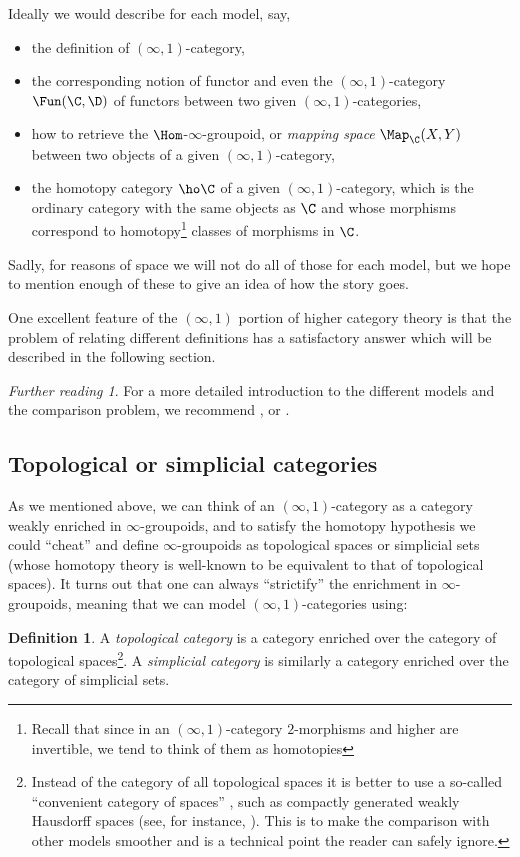 \documentclass{conm-p-l}
\theoremstyle{definition} \newtheorem{definition}[theorem]{Definition}
\theoremstyle{remark} \newtheorem{remark}[theorem]{Remark}
\newtheorem*{further}{Further reading}
\numberwithin{equation}{section}
\newcommand{\oo}{\infty}
\newcommand{\io}{$(\oo,1)$}
\begin{document}
Ideally we would describe for each model, say, \begin{itemize} \item
the definition of \io-category, \item the corresponding notion of
functor and even the \io-category $\Fun(\C,\D)$ of functors between
two given \io-categories, \item how to retrieve the
$\Hom$-$\oo$-groupoid, or \emph{mapping space} $\Map_\C(X,Y)$ between
two objects of a given \io-category, \item the homotopy category $\ho
\C$ of a given \io-category, which is the ordinary category with the
same objects as $\C$ and whose morphisms correspond to
homotopy\footnote{Recall that since in an \io-category $2$-morphisms
and higher are invertible, we tend to think of them as homotopies}
classes of morphisms in $\C$. \end{itemize}

Sadly, for reasons of space we will not do all of those for each
model, but we hope to mention enough of these to give an idea of how
the story goes.

One excellent feature of the \io{} portion of higher category theory
is that the problem of relating different definitions has a
satisfactory answer which will be described in the following section.

\begin{further} For a more detailed introduction to the different
models and the comparison problem, we recommend \cite{BergnerSurvey},
\cite{JoyalTierney} or \cite{Porter}. \end{further}

\subsection{Topological or simplicial categories}

As we mentioned above, we can think of an \io-category as a category
weakly enriched in $\oo$-groupoids, and to satisfy the homotopy
hypothesis we could ``cheat'' and define $\oo$-groupoids as
topological spaces or simplicial sets (whose homotopy theory is
well-known to be equivalent to that of topological spaces). It turns
out that one can always ``strictify'' the enrichment in
$\oo$-groupoids, meaning that we can model \io-categories using:

\begin{definition} A \emph{topological category} is a category
enriched over the category of topological spaces\footnote{Instead of
the category of all topological spaces it is better to use a so-called
``convenient category of spaces'' \cite{Steenrod}, such as compactly
generated weakly Hausdorff spaces (see, for instance,
\cite{Strickland}). This is to make the comparison with other models
smoother and is a technical point the reader can safely ignore.}. A
\emph{simplicial category} is similarly a category enriched over the
category of simplicial sets. \end{definition}
\end{document}
